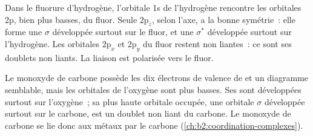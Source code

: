 Dans le fluorure d'hydrogène, l'orbitale 1s de l'hydrogène rencontre les orbitales 2p, bien plus basses,
du fluor. Seule $2\mathrm p_z$, selon l'axe, a la bonne symétrie~: elle forme
une  $\sigma$ développée surtout sur le fluor, et une $\sigma^*$ développée surtout sur
l'hydrogène. Les orbitales $2\mathrm p_x$ et $2\mathrm p_y$ du fluor restent
non liantes~: ce sont ses doublets non liants. La liaison est polarisée vers le fluor.

Le monoxyde de carbone possède les dix électrons de valence de  et un diagramme semblable,
mais les orbitales de l'oxygène sont plus basses. Ses  sont développées surtout sur l'oxygène~;
sa plus haute orbitale occupée, une orbitale $\sigma$ développée surtout sur le carbone, est un doublet non liant
du carbone. Le monoxyde de carbone se lie donc aux métaux par le carbone
(\cref{ch:b2:coordination-complexes}).

